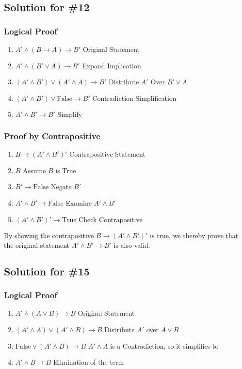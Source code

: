 \documentclass[12pt]{article}
\begin{document}
\subsection*{Solution for \#12}
\subsubsection*{Logical Proof}
\begin{enumerate}
    \item \( A' \land (B \to A) \to B' \) \hfill Original Statement
    \item \( A' \land (B' \lor A) \to B' \) \hfill Expand Implication
    \item \( (A' \land B') \lor (A' \land A) \to B' \) \hfill Distribute \( A' \) Over \( B' \lor A \)
    \item \( (A' \land B') \lor \text{False} \to B' \) \hfill Contradiction Simplification
    \item \( A' \land B' \to B' \) \hfill Simplify
\end{enumerate}

\subsubsection*{Proof by Contrapositive}
\begin{enumerate}
    \item \( B \to (A' \land B')' \) \hfill Contrapositive Statement
    \item \( B \) \hfill Assume \( B \) is True
    \item \( B' \to \text{False} \) \hfill Negate \( B' \)
    \item \( A' \land B' \to \text{False} \) \hfill Examine \( A' \land B' \)
    \item \( (A' \land B')' \to \text{True} \) \hfill Check Contrapositive
\end{enumerate}
By showing the contrapositive \( B \to (A' \land B')' \) is true, we thereby prove that the original statement \( A' \land B' \to B' \) is also valid.

\newpage
\subsection*{Solution for \#15}
\subsubsection*{Logical Proof}
\begin{enumerate}
    \item \( A' \land (A \lor B) \to B \) \hfill Original Statement
    \item \( (A' \land A) \lor (A' \land B) \to B \) \hfill Distribute \( A' \) over \( A \lor B \)
    \item \( \text{False} \lor (A' \land B) \to B \) \hfill \( A' \land A \) is a Contradiction, so it simplifies to 
    \item \( A' \land B \to B \) \hfill Elimination of the  term
\end{enumerate}
\end{document}
